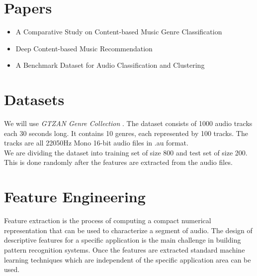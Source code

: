 \documentclass[a4paper,10pt]{article}
\begin{document}
\section{Papers}
\begin{itemize}
 \item A Comparative Study on Content-based Music Genre Classification \cite{Li:2003:CSC:860435.860487}
 \item Deep Content-based Music Recommendation \cite{Oord:2013:DCM:2999792.2999907}
 \item A Benchmark Dataset for Audio Classification and Clustering \cite{HomburgEtAl_2005_ABencDataFor}
\end{itemize}

\section{Datasets}
 
We will use \textit{GTZAN Genre Collection} \cite{GTZAN}.
The dataset consists of 1000 audio tracks each 30 seconds long. It contains 10 genres, each represented by 100 tracks. The tracks are all 22050Hz Mono 16-bit audio files in .au format.\\
We are dividing the dataset into training set of size 800 and test set of size 200.  This is done randomly after the features are extracted from the audio files. 


\section{Feature Engineering}
Feature extraction is the process of computing a compact numerical representation that can be used to characterize a segment of audio. The design of descriptive features for a specific application is the main challenge in building pattern recognition systems. Once the features are extracted standard machine learning techniques which are independent of the specific application area can be used.
\end{document}

